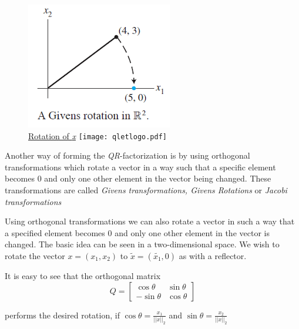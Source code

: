 \documentclass[12pt]{article}
\begin{document}
\begin{figure}
\centering
\caption{\href {https://github.com/thsis/NIS18/blob/master/media/plots}{Rotation of \textit{x}}  \protect\texttt{[image: qletlogo.pdf]}}
\includegraphics[scale=0.5]{../media/plots/givens.png}
\end{figure}

Another way of forming the \textit{QR}-factorization is by using orthogonal transformations which rotate a vector in a way such that a specific element becomes 0 and only one other element in the vector being changed. These transformations are called \textit{Givens transformations, Givens Rotations} or \textit{Jacobi transformations}

Using orthogonal transformations we can also rotate a vector in such a way that a specified element becomes 0 and only one other element in the vector is changed. The basic idea can be seen in a two-dimensional space. We wish to rotate the vector $x = (x_1, x_2)$ to $\tilde{x} = (\tilde{x_1}, 0)$ as with a reflector.

It is easy to see that the orthogonal matrix 
$$Q=\begin{bmatrix}
\cos\theta & \sin\theta \\
-\sin\theta & \cos\theta
\end{bmatrix}$$

performs the desired rotation, if $\cos\theta = \frac{x_1}{||x||_2}$ and $\sin\theta = \frac{x_2}{||x||_2}$
\end{document}
